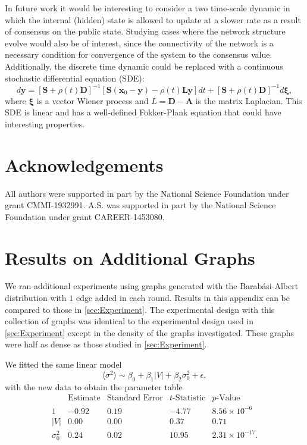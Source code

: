 \documentclass[aps,superscriptaddress,floatfix,amsmath,amssymb]{revtex4-2}
\begin{document}
In future work it would be interesting to consider a two time-scale dynamic in which the internal (hidden) state is allowed to update at a slower rate as a result of consensus on the public state. Studying cases where the network structure evolve would also be of interest, since the connectivity of the network is a necessary condition for convergence of the system to the consensus value. Additionally, the discrete time dynamic could be replaced with a continuous stochastic differential equation (SDE):
\begin{equation*}
d\mathbf{y} = \left[\mathbf{S}+\rho(t)\mathbf{D}\right]^{-1}\left[\mathbf{S}\left(\mathbf{x}_0 - \mathbf{y}\right) - \rho(t)\mathbf{L}\mathbf{y}\right]dt + \left[\mathbf{S} + \rho(t) \mathbf{D}\right]^{-1}d\bm{\xi},
\end{equation*}
where $\bm{\xi}$ is a vector Wiener process and $L = \mathbf{D} - \mathbf{A}$ is the matrix Laplacian. This SDE is linear and has a well-defined Fokker-Plank equation that could have interesting properties. 

\section*{Acknowledgements}
All authors were supported in part by the National Science Foundation under grant CMMI-1932991. A.S. was supported in part by the National Science Foundation under grant CAREER-1453080.

\appendix

\section{Results on Additional Graphs}
We ran additional experiments using graphs generated with the Barab\'{a}si-Albert distribution \cite{BA99a} with $1$ edge added in each round. Results in this appendix can be compared to those in \cref{sec:Experiment}. The experimental design with this collection of graphs was identical to the experimental design used in \cref{sec:Experiment} except in the density of the graphs investigated. These graphs were half as dense as those studied in \cref{sec:Experiment}.

We fitted the same linear model
\begin{equation}
\langle{\sigma^2}\rangle \sim \beta_0 + \beta_1|V| + \beta_2\sigma_0^2 + \epsilon,
\label{eq:LinModelApp}
\end{equation}
with the new data to obtain the parameter table
\begin{equation*}
\begin{array}{l|llll}
 \text{} & \text{Estimate} & \text{Standard Error} & \text{$t$-Statistic} & \text{$p$-Value} \\
\hline
 1 & -0.92 & 0.19 & -4.77 & 8.56\times 10^{-6} \\
 |V| & 0.00 & 0.00 & 0.37 & 0.71 \\
 \sigma_0^2  & 0.24 & 0.02 & 10.95 & 2.31\times 10^{-17}. \\
\end{array}
\end{equation*}
\end{document}
